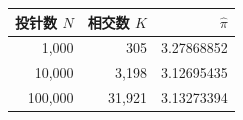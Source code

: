 \begin{tabular}{rrr}
\toprule
投针数 $N$ & 相交数 $K$ & $\widehat{\pi}$ \\
\midrule
1,000 & 305 & 3.27868852 \\
10,000 & 3,198 & 3.12695435 \\
100,000 & 31,921 & 3.13273394 \\
\bottomrule
\end{tabular}
